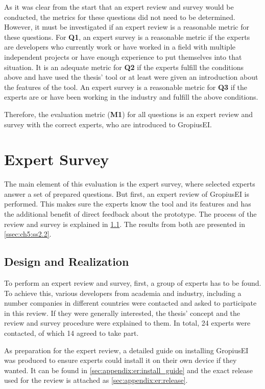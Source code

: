 As it was clear from the start that an expert review and survey would be conducted, the metrics for these questions did not need to be determined.
However, it must be investigated if an expert review is a reasonable metric for these questions.
For \textbf{Q1}, an expert survey is a reasonable metric if the experts are developers who currently work or have worked in a field with multiple independent projects or have enough experience to put themselves into that situation.
It is an adequate metric for \textbf{Q2} if the experts fulfill the conditions above and have used the thesis' tool or at least were given an introduction about the features of the tool.
An expert survey is a reasonable metric for \textbf{Q3} if the experts are or have been working in the industry and fulfill the above conditions.

Therefore, the evaluation metric (\textbf{M1}) for all questions is an expert review and survey with the correct experts, who are introduced to \gls{GropiusEI}. 

\section{Expert Survey}
\label{sec:ch5:s2}
The main element of this evaluation is the expert survey, where selected experts answer a set of prepared questions. 
But first, an expert review of \gls{GropiusEI} is performed.
This makes sure the experts know the tool and its features and has the additional benefit of direct feedback about the prototype.
The process of the review and survey is explained in \cref{ssec:ch5:ss2.1}.
The results from both are presented in \cref{ssec:ch5:ss2.2}.

\subsection{Design and Realization}
\label{ssec:ch5:ss2.1}
To perform an expert review and survey, first, a group of experts has to be found.
To achieve this, various developers from academia and industry, including a number companies in different countries were contacted and asked to participate in this review.
If they were generally interested, the thesis' concept and the review and survey procedure were explained to them.
In total, 24 experts were contacted, of which 14 agreed to take part.

As preparation for the expert review, a detailed guide on installing \gls{GropiusEI} was produced
to ensure experts could install it on their own device if they wanted.
It can be found in \cref{sec:appendix:er:install_guide} and
the exact release used for the review is attached as \cref{sec:appendix:er:release}.


